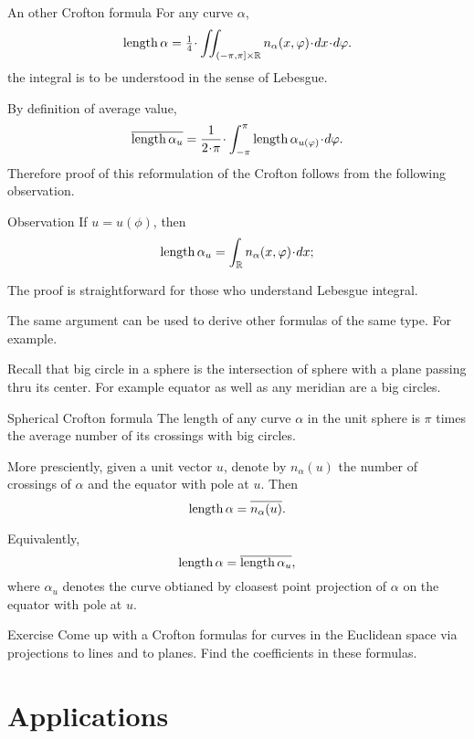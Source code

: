 \begin{thm}{An other Crofton formula}
For any curve $\alpha$,
\[\length\alpha=\tfrac14\cdot\iint_{(-\pi,\pi]\times \RR} n_\alpha(x,\phi)\cdot dx\cdot d\phi.\]
the integral is to be understood in the sense of Lebesgue.
\end{thm}

By definition of average value,
\[\overline{\length\alpha_u}
=
\frac1{2\cdot\pi}\cdot\int_{-\pi}^\pi \length\alpha_{u(\phi)}\cdot d\phi.\]
Therefore  proof of this reformulation of the Crofton follows from the following observation.

\begin{thm}{Observation}
If $u=u(\phi)$, then 
\[\length\alpha_u=\int_\RR n_\alpha(x,\phi)\cdot dx;\]

\end{thm}

The proof is straightforward for those who understand Lebesgue integral.

The same argument can be used to derive other formulas of the same type.
For example.

Recall that big circle in a sphere is the intersection of sphere with a plane passing thru its center.
For example equator as well as any meridian are a big circles.

\begin{thm}{Spherical Crofton formula}
The length of any curve $\alpha$ in the unit sphere is $\pi$ times the average number of its crossings with big circles.

More presciently, given a unit vector $u$, denote by $n_\alpha(u)$ the number of crossings of $\alpha$ and the equator with pole at $u$.
Then 
\[\mathop{\rm length}\nolimits\alpha=\overline{n_\alpha(u)}.\]

Equivalently,
\[\mathop{\rm length}\nolimits\alpha=\overline{\mathop{\rm length}\nolimits\alpha_u},\]
where $\alpha_u$ denotes the curve obtianed by cloasest point projection of $\alpha$ on the equator with pole at $u$.
\end{thm}


\begin{thm}{Exercise}
Come up with a Crofton formulas for curves in the Euclidean space via projections to lines and to planes.
Find the coefficients in these formulas.
\end{thm}

\section{Applications}

